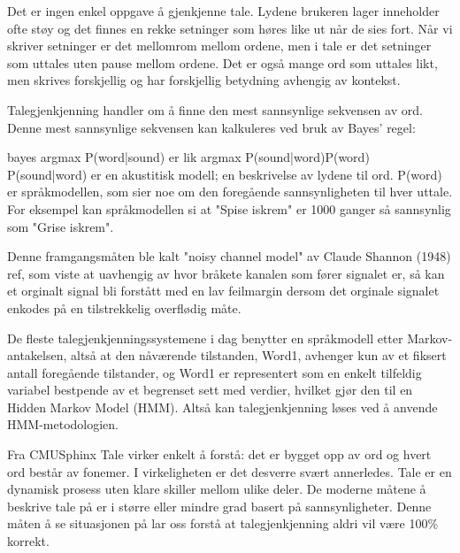 Det er ingen enkel oppgave å gjenkjenne tale. Lydene brukeren lager inneholder ofte støy og det finnes en rekke setninger som høres like ut når de sies fort. Når vi skriver setninger er det mellomrom mellom ordene, men i tale er det setninger som uttales uten pause mellom ordene. Det er også mange ord som uttales likt, men skrives forskjellig og har forskjellig betydning avhengig av kontekst.

Talegjenkjenning handler om å finne den mest sannsynlige sekvensen av ord. Denne mest sannsynlige sekvensen kan kalkuleres ved bruk av Bayes' regel:

{\color{red}bayes} argmax P(word|sound) er lik argmax P(sound|word)P(word)
P(sound|word) er en akustitisk modell; en beskrivelse av lydene til ord. P(word) er språkmodellen, som sier noe om den foregående sannsynligheten til hver uttale. For eksempel kan språkmodellen si at "Spise iskrem" er 1000 ganger så sannsynlig som "Grise iskrem".

Denne framgangsmåten ble kalt "noisy channel model" av Claude Shannon (1948) {\color{red}ref}, som viste at uavhengig av hvor bråkete kanalen som fører signalet er, så kan et orginalt signal bli forstått med en lav feilmargin dersom det orginale signalet enkodes på en tilstrekkelig overflødig måte.

De fleste talegjenkjenningssystemene i dag benytter en språkmodell etter Markov-antakelsen, altså at den nåværende tilstanden, Word1, avhenger kun av et fiksert antall foregående tilstander, og Word1 er representert som en enkelt tilfeldig variabel bestpende av et begrenset sett med verdier, hvilket gjør den til en Hidden Markov Model (HMM). Altså kan talegjenkjenning løses ved å anvende HMM-metodologien.



{\color{blue}Fra CMUSphinx}
Tale virker enkelt å forstå: det er bygget opp av ord og hvert ord består av fonemer. I virkeligheten er det desverre svært annerledes. Tale er en dynamisk prosess uten klare skiller mellom ulike deler. De moderne måtene å beskrive tale på er i større eller mindre grad basert på sannsynligheter. Denne måten å se situasjonen på lar oss forstå at talegjenkjenning aldri vil være 100\% korrekt.

